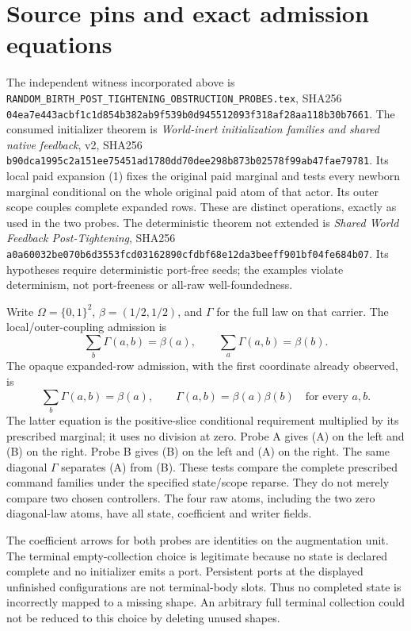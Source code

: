 \documentclass[11pt]{article}\usepackage{amsmath,amssymb,geometry}\geometry{margin=1in}
\begin{document}
\section*{Source pins and exact admission equations}
The independent witness incorporated above is
\texttt{RANDOM\_BIRTH\_POST\_TIGHTENING\_OBSTRUCTION\_PROBES.tex},
SHA256 \texttt{04ea7e443acbf1c1d854b382ab9f539b0d945512093f318af28aa118b30b7661}.
The consumed initializer theorem is \emph{World-inert initialization families and shared native feedback}, v2,
SHA256 \texttt{b90dca1995c2a151ee75451ad1780dd70dee298b873b02578f99ab47fae79781}.
Its local paid expansion (1) fixes the original paid marginal and tests every newborn marginal conditional on the whole original paid atom of that actor. Its outer scope couples complete expanded rows. These are distinct operations, exactly as used in the two probes.
The deterministic theorem not extended is \emph{Shared World Feedback Post-Tightening},
SHA256 \texttt{a0a60032be070b6d3553fcd03162890cfdbf68e12da3beeff901bf04fe684b07}.
Its hypotheses require deterministic port-free seeds; the examples violate determinism, not port-freeness or all-raw well-foundedness.

Write $\Omega=\{0,1\}^2$, $\beta=(1/2,1/2)$, and $\Gamma$ for the full law on that carrier. The local/outer-coupling admission is
\[
 \sum_b\Gamma(a,b)=\beta(a),\qquad
 \sum_a\Gamma(a,b)=\beta(b).                         \tag{A}
\]
The opaque expanded-row admission, with the first coordinate already observed, is
\[
 \sum_b\Gamma(a,b)=\beta(a),\qquad
 \Gamma(a,b)=\beta(a)\beta(b)\quad\text{for every }a,b.\tag{B}
\]
The latter equation is the positive-slice conditional requirement multiplied by its prescribed marginal; it uses no division at zero. Probe A gives (A) on the left and (B) on the right. Probe B gives (B) on the left and (A) on the right. The same diagonal $\Gamma$ separates (A) from (B). These tests compare the complete prescribed command families under the specified state/scope reparse. They do not merely compare two chosen controllers. The four raw atoms, including the two zero diagonal-law atoms, have all state, coefficient and writer fields.

The coefficient arrows for both probes are identities on the augmentation unit. The terminal empty-collection choice is legitimate because no state is declared complete and no initializer emits a port. Persistent ports at the displayed unfinished configurations are not terminal-body slots. Thus no completed state is incorrectly mapped to a missing shape. An arbitrary full terminal collection could not be reduced to this choice by deleting unused shapes.
\end{document}
